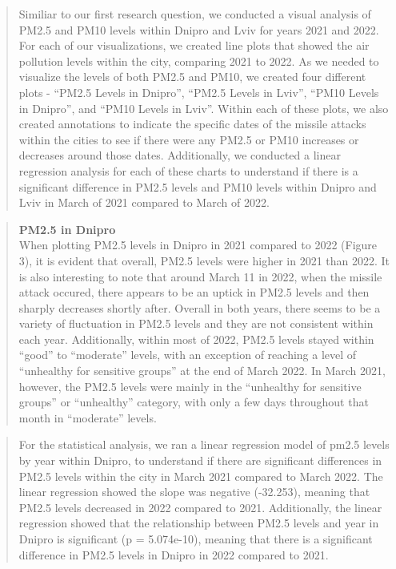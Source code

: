 \documentclass[
  12pt,
]{article}
\begin{document}
\begin{quote}
Similiar to our first research question, we conducted a visual analysis
of PM2.5 and PM10 levels within Dnipro and Lviv for years 2021 and 2022.
For each of our visualizations, we created line plots that showed the
air pollution levels within the city, comparing 2021 to 2022. As we
needed to visualize the levels of both PM2.5 and PM10, we created four
different plots - ``PM2.5 Levels in Dnipro'', ``PM2.5 Levels in Lviv'',
``PM10 Levels in Dnipro'', and ``PM10 Levels in Lviv''. Within each of
these plots, we also created annotations to indicate the specific dates
of the missile attacks within the cities to see if there were any PM2.5
or PM10 increases or decreases around those dates. Additionally, we
conducted a linear regression analysis for each of these charts to
understand if there is a significant difference in PM2.5 levels and PM10
levels within Dnipro and Lviv in March of 2021 compared to March of
2022.\\
\end{quote}

\begin{quote}
\textbf{PM2.5 in Dnipro}\\
When plotting PM2.5 levels in Dnipro in 2021 compared to 2022 (Figure
3), it is evident that overall, PM2.5 levels were higher in 2021 than
2022. It is also interesting to note that around March 11 in 2022, when
the missile attack occured, there appears to be an uptick in PM2.5
levels and then sharply decreases shortly after. Overall in both years,
there seems to be a variety of fluctuation in PM2.5 levels and they are
not consistent within each year. Additionally, within most of 2022,
PM2.5 levels stayed within ``good'' to ``moderate'' levels, with an
exception of reaching a level of ``unhealthy for sensitive groups'' at
the end of March 2022. In March 2021, however, the PM2.5 levels were
mainly in the ``unhealthy for sensitive groups'' or ``unhealthy''
category, with only a few days throughout that month in ``moderate''
levels.
\end{quote}

\begin{quote}
For the statistical analysis, we ran a linear regression model of pm2.5
levels by year within Dnipro, to understand if there are significant
differences in PM2.5 levels within the city in March 2021 compared to
March 2022. The linear regression showed the slope was negative
(-32.253), meaning that PM2.5 levels decreased in 2022 compared to 2021.
Additionally, the linear regression showed that the relationship between
PM2.5 levels and year in Dnipro is significant (p = 5.074e-10), meaning
that there is a significant difference in PM2.5 levels in Dnipro in 2022
compared to 2021.
\end{quote}
\end{document}
